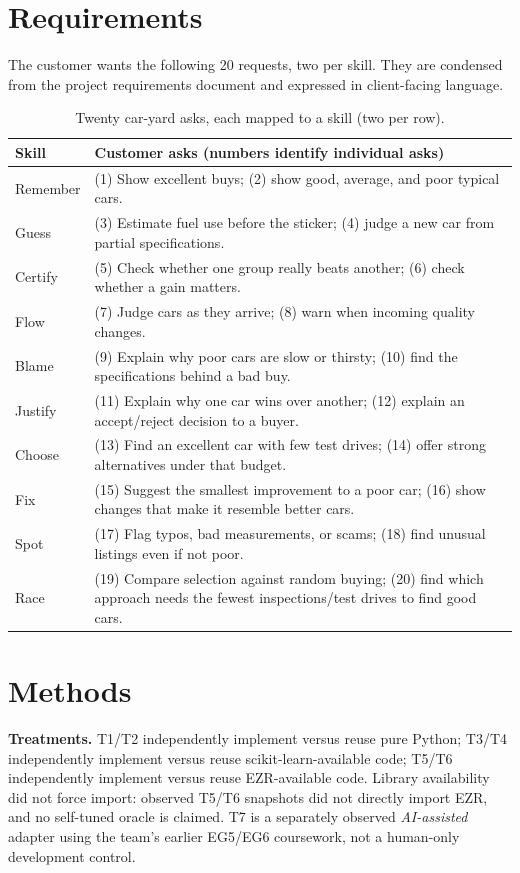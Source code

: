 \documentclass[sigconf,nonacm]{acmart}
\begin{document}
\section{Requirements}
The customer wants the following 20 requests, two per skill. They are condensed from the project requirements document and expressed in client-facing language.
\begin{table}[h]
\caption{Twenty car-yard asks, each mapped to a skill (two per row).}
\label{tab:req}
\centering\scriptsize
\begin{tabular}{@{}lp{}@{}}
\toprule
Skill & Customer asks (numbers identify individual asks)\\\midrule
Remember & (1) Show excellent buys; (2) show good, average, and poor typical cars.\\
Guess & (3) Estimate fuel use before the sticker; (4) judge a new car from partial specifications.\\
Certify & (5) Check whether one group really beats another; (6) check whether a gain matters.\\
Flow & (7) Judge cars as they arrive; (8) warn when incoming quality changes.\\
Blame & (9) Explain why poor cars are slow or thirsty; (10) find the specifications behind a bad buy.\\
Justify & (11) Explain why one car wins over another; (12) explain an accept/reject decision to a buyer.\\
Choose & (13) Find an excellent car with few test drives; (14) offer strong alternatives under that budget.\\
Fix & (15) Suggest the smallest improvement to a poor car; (16) show changes that make it resemble better cars.\\
Spot & (17) Flag typos, bad measurements, or scams; (18) find unusual listings even if not poor.\\
Race & (19) Compare selection against random buying; (20) find which approach needs the fewest inspections/test drives to find good cars.\\
\bottomrule
\end{tabular}
\end{table}

\section{Methods}
\textbf{Treatments.} T1/T2 independently implement versus reuse pure Python; T3/T4 independently implement versus reuse scikit-learn-available code; T5/T6 independently implement versus reuse EZR-available code. Library availability did not force import: observed T5/T6 snapshots did not directly import EZR, and no self-tuned oracle is claimed. T7 is a separately observed \emph{AI-assisted} adapter using the team's earlier EG5/EG6 coursework, not a human-only development control.
\end{document}
